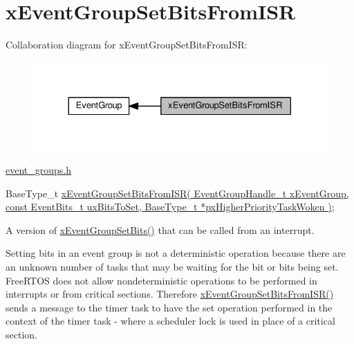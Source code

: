 \hypertarget{group__xEventGroupSetBitsFromISR}{}\section{x\+Event\+Group\+Set\+Bits\+From\+I\+SR}
\label{group__xEventGroupSetBitsFromISR}
Collaboration diagram for x\+Event\+Group\+Set\+Bits\+From\+I\+SR\+:\nopagebreak
\begin{figure}[H]
\begin{center}
\leavevmode
\includegraphics[width=330pt]{d7/de3/group__xEventGroupSetBitsFromISR}
\end{center}
\end{figure}
\hyperlink{event__groups_8h}{event\+\_\+groups.\+h} 
\begin{DoxyPre}
   BaseType\_t \hyperlink{event__groups_8h_a62b68278abac6358369ae8e390988a02}{xEventGroupSetBitsFromISR( EventGroupHandle\_t xEventGroup, const EventBits\_t uxBitsToSet, BaseType\_t *pxHigherPriorityTaskWoken )};
\end{DoxyPre}


A version of \hyperlink{event__groups_8h_a02d7b3bb55f7e11d9c47116266c5fb2e}{x\+Event\+Group\+Set\+Bits()} that can be called from an interrupt.

Setting bits in an event group is not a deterministic operation because there are an unknown number of tasks that may be waiting for the bit or bits being set. Free\+R\+T\+OS does not allow nondeterministic operations to be performed in interrupts or from critical sections. Therefore \hyperlink{event__groups_8h_a62b68278abac6358369ae8e390988a02}{x\+Event\+Group\+Set\+Bits\+From\+I\+S\+R()} sends a message to the timer task to have the set operation performed in the context of the timer task -\/ where a scheduler lock is used in place of a critical section.


